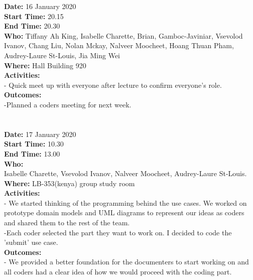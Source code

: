 \documentclass[12pt]{article}
\begin{document}
{\bf Date:} 16 January 2020 \\
{\bf Start Time:} 20.15 \\
{\bf End Time:} 20.30 \\
{\bf Who:} Tiffany Ah King, Isabelle Charette, Brian, Gamboc-Javiniar, Vsevolod Ivanov, Chang Liu, Nolan Mckay, Nalveer Moocheet, Hoang Thuan Pham, Audrey-Laure St-Louis, Jia Ming Wei \\
{\bf Where:} Hall Building 920 \\
{\bf Activities:}\\
- Quick meet up with everyone after lecture to confirm everyone's role.\\ 
{\bf Outcomes:}\\
-Planned a coders meeting for next week.
\\
\\
\\
{\bf Date:} 17 January 2020 \\
{\bf Start Time:} 10.30 \\
{\bf End Time:} 13.00 \\
{\bf Who:}\\ Isabelle Charette, Vsevolod Ivanov, Nalveer Moocheet, Audrey-Laure St-Louis. \\
{\bf Where:} LB-353(kenya) group study room \\
{\bf Activities:}\\
- We started thinking of the programming behind the use cases. We worked on prototype domain models and UML diagrams to represent our ideas as coders and shared them to the rest of the team.\\
-Each coder selected the part they want to work on. I decided to code the 'submit' use case.\\
{\bf Outcomes:}\\
- We provided a better foundation for the documenters to start working on and all coders had a clear idea of how we would proceed with the coding part.\\
\end{document}
